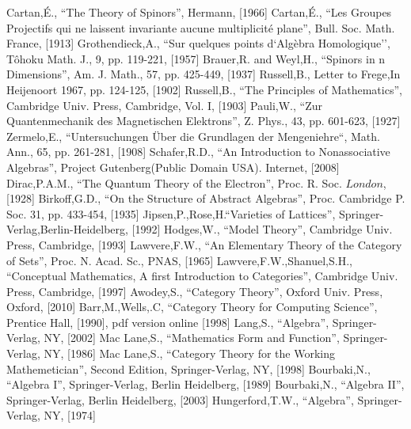 \documentclass[aps,twocolumn,secnumarabic,nobalancelastpage,amsmath,amssymb,
amsthm,nofootinbib,parskip=full]{revtex4}
\numberwithin{equation}{section}
\begin{document}

\begin{thebibliography}{99}
Cartan,\'{E}., ``The Theory of Spinors'', Hermann, [1966]
Cartan,\'{E}., ``Les Groupes Projectifs qui ne laissent
  invariante aucune multiplicit\'{e} plane'', Bull. Soc. Math. France, [1913]
Grothendieck,A., ``Sur quelques points d`Alg\`{e}bra Homologique'', T\^{o}hoku Math. J., 9, pp. 119-221, [1957]
Brauer,R. and Weyl,H., ``Spinors in n Dimensions'', Am. J. Math., 57, pp. 425-449, [1937]
Russell,B., Letter to Frege,In Heijenoort 1967, pp. 124-125, [1902]
Russell,B., ``The Principles of Mathematics'', Cambridge Univ. Press, Cambridge, Vol. I, [1903]
Pauli,W., ``Zur Quantenmechanik des Magnetischen Elektrons'', Z. Phys., 43, pp. 601-623, [1927]
Zermelo,E., ``Untersuchungen \"{U}ber die Grundlagen der Mengeniehre``, Math. Ann., 65, pp. 261-281, [1908]
Schafer,R.D., ``An Introduction to Nonassociative Algebras'', Project Gutenberg(Public Domain USA). Internet, [2008]
Dirac,P.A.M., ``The Quantum Theory of the Electron'', Proc. R. Soc. \(London\), [1928]
Birkoff,G.D., ``On the Structure of Abstract Algebras'', Proc. Cambridge P. Soc. 31, pp. 433-454, [1935]
Jipsen,P.,Rose,H.``Varieties of Lattices'', Springer-Verlag,Berlin-Heidelberg, [1992]
Hodges,W., ``Model Theory'', Cambridge Univ. Press, Cambridge, [1993]
Lawvere,F.W., ``An Elementary Theory of the Category of Sets'', Proc. N. Acad. Sc., PNAS, [1965]
Lawvere,F.W.,Shanuel,S.H., ``Conceptual Mathematics, A first Introduction to Categories'', Cambridge Univ. Press, Cambridge, [1997]
Awodey,S., ``Category Theory'', Oxford Univ. Press, Oxford, [2010]
Barr,M.,Wells,.C, ``Category Theory for Computing Science'', Prentice Hall, [1990], pdf version online [1998]
Lang,S., ``Algebra'', Springer-Verlag, NY, [2002]
Mac Lane,S., ``Mathematics Form and Function'', Springer-Verlag, NY, [1986]
Mac Lane,S., ``Category Theory for the Working Mathemetician'', Second Edition, Springer-Verlag, NY, [1998]
Bourbaki,N., ``Algebra I'', Springer-Verlag, Berlin Heidelberg, [1989]
Bourbaki,N., ``Algebra II'', Springer-Verlag, Berlin Heidelberg, [2003]
Hungerford,T.W., ``Algebra'', Springer-Verlag, NY, [1974]

\end{thebibliography}
\end{document}
